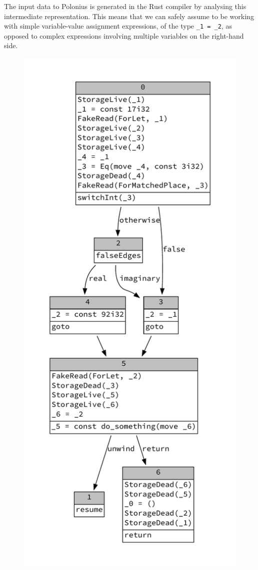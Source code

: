 \documentclass[11pt,a4paper,twoside,openany]{report}
\newcommand{\InRust}[1]{\texttt{#1}}
\begin{document}
The input data to Polonius is generated in the Rust compiler by analysing this
intermediate representation. This means that we can safely assume to be working
with simple variable-value assignment expressions, of the type \InRust{_1 = _2},
as opposed to complex expressions involving multiple variables on the right-hand
side.

\begin{figure}
\noindent
\begin{minipage}{.5\textwidth}
\includegraphics[width=\linewidth]{Graphs/mir-example}

\end{minipage}
\end{figure}
\end{document}
